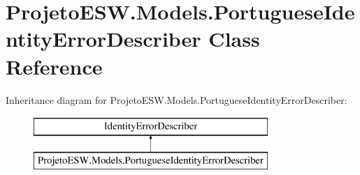 \hypertarget{class_projeto_e_s_w_1_1_models_1_1_portuguese_identity_error_describer}{}\section{Projeto\+E\+S\+W.\+Models.\+Portuguese\+Identity\+Error\+Describer Class Reference}
\label{class_projeto_e_s_w_1_1_models_1_1_portuguese_identity_error_describer}
Inheritance diagram for Projeto\+E\+S\+W.\+Models.\+Portuguese\+Identity\+Error\+Describer\+:\begin{figure}[H]
\begin{center}
\leavevmode
\includegraphics[height=2.000000cm]{class_projeto_e_s_w_1_1_models_1_1_portuguese_identity_error_describer}
\end{center}
\end{figure}
